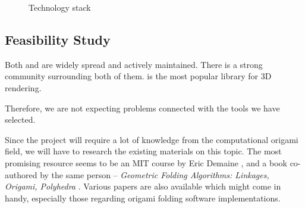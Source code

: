 \begin{figure}[H]
	\caption{Technology stack}
	\centering
\end{figure}


\subsection{Feasibility Study}

Both  and  are widely spread and actively maintained.
There is a strong community surrounding both of them.
 is the most popular library for 3D  rendering.

Therefore, we are not expecting problems connected with the tools we have selected.

Since the project will require a lot of knowledge from the computational origami
field, we will have to research the existing materials on this topic.
The most promising resource seems to be an MIT course by
Eric Demaine \cite{mit-course}, and a book co-authored by the same person -- \textit{Geometric Folding Algorithms: Linkages, Origami, Polyhedra} \cite{origami-book}.
Various papers are also available which might come in handy, especially those regarding origami folding software implementations.


